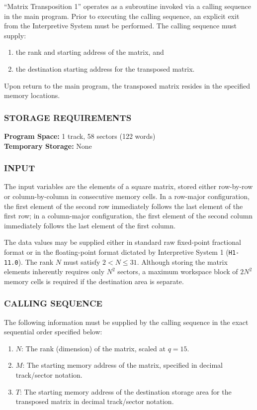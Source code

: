 \documentclass{article}
\begin{document}
\noindent
``Matrix Transposition 1'' operates as a subroutine invoked via a calling sequence in the main program. Prior to executing the calling sequence, an explicit exit from the Interpretive System must be performed. The calling sequence must supply: 
\begin{enumerate}
	\item the rank and starting address of the matrix, and 
	\item the destination starting address for the transposed matrix. 
\end{enumerate}
\noindent
Upon return to the main program, the transposed matrix resides in the specified memory locations.

\subsubsection*{STORAGE REQUIREMENTS}
\noindent
\textbf{Program Space:} 1 track, 58 sectors (122 words) \\
\textbf{Temporary Storage:} None

\subsubsection*{INPUT}
The input variables are the elements of a square matrix, stored either row-by-row or column-by-column in consecutive memory cells. In a row-major configuration, the first element of the second row immediately follows the last element of the first row; in a column-major configuration, the first element of the second column immediately follows the last element of the first column. 

\noindent
The data values may be supplied either in standard raw fixed-point fractional format or in the floating-point format dictated by Interpretive System 1 (\texttt{H1-11.0}). The rank $N$ must satisfy $2 < N \le 31$. Although storing the matrix elements inherently requires only $N^2$ sectors, a maximum workspace block of $2N^2$ memory cells is required if the destination area is separate.

\subsubsection*{CALLING SEQUENCE}
The following information must be supplied by the calling sequence in the exact sequential order specified below:
\begin{enumerate}[label=\arabic*., leftmargin=1.5em, itemsep=2pt]
    \item $N$: The rank (dimension) of the matrix, scaled at $q=15$.
    \item $M$: The starting memory address of the matrix, specified in decimal track/sector notation.
    \item $T$: The starting memory address of the destination storage area for the transposed matrix in decimal track/sector notation.
\end{enumerate}
\end{document}
